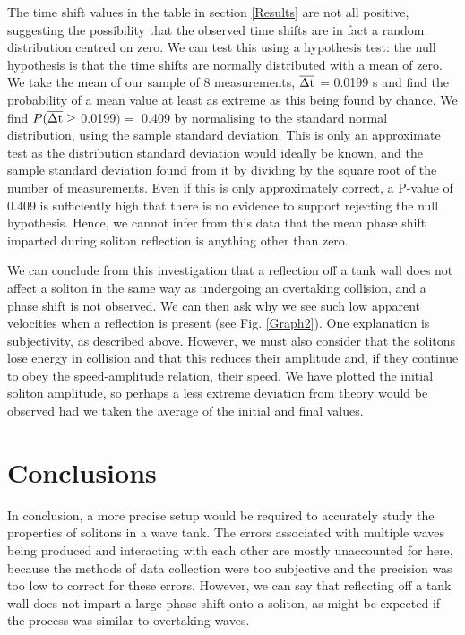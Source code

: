 \documentclass[10pt, twocolumn]{revtex4}    %
\begin{document}
The time shift values in the table in section \ref{Results} are not all positive, suggesting the possibility that the observed time shifts are in fact a random distribution centred on zero. We can test this using a hypothesis test: the null hypothesis is that the time shifts are normally distributed with a mean of zero. We take the mean of our sample of 8 measurements, $\overline{\rm \Delta t}$ = 0.0199 s and find the probability of a mean value at least as extreme as this being found by chance. We find $P(\overline{\rm \Delta t} \geq $ 0.0199$) =$ 0.409 by normalising to the standard normal distribution, using the sample standard deviation. This is only an approximate test as the distribution standard deviation would ideally be known, and the sample standard deviation found from it by dividing by the square root of the number of measurements. Even if this is only approximately correct, a P-value of 0.409 is sufficiently high that there is no evidence to support rejecting the null hypothesis. Hence, we cannot infer from this data that the mean phase shift imparted during soliton reflection is anything other than zero. 

We can conclude from this investigation that a reflection off a tank wall does not affect a soliton in the same way as undergoing an overtaking collision, and a phase shift is not observed. We can then ask why we see such low apparent velocities when a reflection is present (see Fig. \ref{Graph2}). One explanation is subjectivity, as described above. However, we must also consider that the solitons lose energy in collision and that this reduces their amplitude and, if they continue to obey the speed-amplitude relation, their speed. We have plotted the initial soliton amplitude, so perhaps a less extreme deviation from theory would be observed had we taken the average of the initial and final values. 


\section{Conclusions}
 
In conclusion, a more precise setup would be required to accurately study the properties of solitons in a wave tank. The errors associated with multiple waves being produced and interacting with each other are mostly unaccounted for here, because the methods of data collection were too subjective and the precision was too low to correct for these errors. However, we can say that reflecting off a tank wall does not impart a large phase shift onto a soliton, as might be expected if the process was similar to overtaking waves. 
\end{document}

